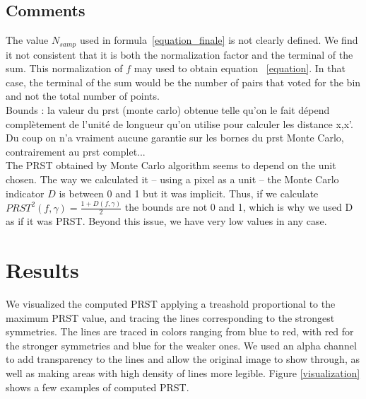 \documentclass[10pt,a4paper]{article}			%
\begin{document}
  	\subsection{Comments}
  	\label{comments}
  	The value $N_{samp}$ used in formula~\eqref{equation_finale} is not clearly defined. We find it not consistent that it is both the normalization factor and the terminal of the sum. This normalization of $f$ may used to obtain equation ~\eqref{equation}. In that case, the terminal of the sum would be the number of pairs that voted for the bin and not the total number of points.\\
  	
  	Bounds : la valeur du prst (monte carlo) obtenue telle qu'on le fait dépend complètement de l'unité de longueur qu'on utilise pour calculer les distance x,x'. Du coup on n'a vraiment aucune garantie sur les bornes du prst Monte Carlo, contrairement au prst complet...\\
  	
	The PRST obtained by Monte Carlo algorithm seems to depend on the unit chosen. The way we calculated it -- using a pixel as a unit -- the Monte Carlo indicator $D$ is  between 0 and 1 but it was implicit. Thus, if we calculate $PRST^2(f,\gamma) = \frac{1 + D(f,\gamma)}{2}$ the bounds are not 0 and 1, which is why we used D as if it was PRST. Beyond this issue, we have very low values in any case.
  	
  	
  	\section{Results}

We visualized the computed PRST applying a treashold proportional to the maximum PRST value, and tracing the lines corresponding to the strongest symmetries. The lines are traced in colors ranging from blue to red, with red for the stronger symmetries and blue for the weaker ones. We used an alpha channel to add transparency to the lines and allow the original image to show through, as well as making areas with high density of lines more legible. Figure \ref{visualization} shows a few examples of computed PRST.
\end{document}
